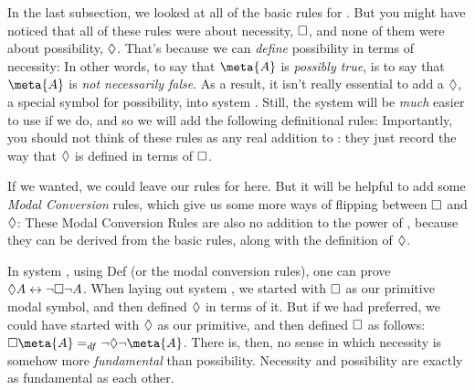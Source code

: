 In the last subsection, we looked at all of the basic rules for \mlK. But you might have noticed that all of these rules were about necessity, $\Box$, and none of them were about possibility, $\Diamond$. That's because we can \emph{define} possibility in terms of necessity:
In other words, to say that $\meta{A}$ is \emph{possibly true}, is to say that $\meta{A}$ is \emph{not necessarily false}. As a result, it isn't really essential to add a $\Diamond$, a special symbol for possibility, into system \mlK. Still, the system will be \emph{much} easier to use if we do, and so we will add the following definitional rules:
Importantly, you should not think of these rules as any real addition to \mlK: they just record the way that $\Diamond$ is defined in terms of $\Box$.

If we wanted, we could leave our rules for \mlK{} here. But it will be helpful to add some \emph{Modal Conversion} rules, which give us some more ways of flipping between $\Box$ and $\Diamond$:
These Modal Conversion Rules are also no addition to the power of \mlK, because they can be derived from the basic rules, along with the definition of $\Diamond$.

In system \mlK, using Def\ediamond{} (or the modal conversion rules), one can prove $\Diamond A \leftrightarrow \neg\Box\neg A$. When laying out system \mlK, we started with $\Box$ as our primitive modal symbol, and then defined $\Diamond$ in terms of it. But if we had preferred, we could have started with $\Diamond$ as our primitive, and then defined $\Box$ as follows: $\ebox\meta{A} =_{df} \enot \ediamond \enot \meta{A}$. There is, then, no sense in which necessity is somehow more \emph{fundamental} than possibility. Necessity and possibility are exactly as fundamental as each other.

